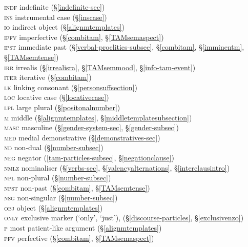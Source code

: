 \begin{tabbing}
	\textsc{indf} \> {indefinite (\S\ref{indefinite-sec})}\\
	\textsc{ins} \> {instrumental case (\S\ref{inscase})}\\
	\textsc{io} \> {indirect object (\S\ref{alignmtemplates})}\\
	\textsc{ipfv} \> {imperfective (\S\ref{combitam}, \S\ref{TAMsemaspect})}\\
	\textsc{ipst} \> {immediate past (\S\ref{verbal-proclitics-subsec}, \S\ref{combitam}, \S\ref{imminentm}, \S\ref{TAMsemtense})}\\
	\textsc{irr} \> {irrealis (\S\ref{irrealisra}, \S\ref{TAMsemmood}, \S\ref{info-tam-event})}\\
	\textsc{iter} \> {iterative  (\S\ref{combitam})}\\
	\textsc{lk} \> {linking consonant (\S\ref{personsuffsection})}\\
	\textsc{loc} \> {locative case (\S\ref{locativecase})}\\
	\textsc{lpl} \> {large plural (\S\ref{positonalnumber})}\\
	\textsc{m} \> {middle (\S\ref{alignmtemplates}, \S\ref{middletemplatesubsection})}\\
	\textsc{masc} \> {masculine (\S\ref{gender-system-sec}, \S\ref{gender-subsec})}\\
	\textsc{med} \> {medial demonstrative (\S\ref{demonstratives-sec})}\\
	\textsc{nd} \> {non-dual (\S\ref{number-subsec})}\\
	\textsc{neg} \> {negator (\ref{tam-particles-subsec}, \S\ref{negationclause})} \\
	\textsc{nmlz} \> {nominaliser (\S\ref{verbs-sec}, \S\ref{valencyalternations}, \S\ref{interclausintro})}\\
	\textsc{npl} \> {non-plural (\S\ref{number-subsec})}\\
	\textsc{npst} \> {non-past (\S\ref{combitam}, \S\ref{TAMsemtense})}\\
	\textsc{nsg} \> {non-singular (\S\ref{number-subsec})}\\
	\textsc{obj} \> {object (\S\ref{alignmtemplates})}\\
	\textsc{only} \> {exclusive marker (`only', `just'), (\S\ref{discourse-particles}, \S\ref{exclusivenzo})}\\
	\textsc{p} \> {most patient-like argument (\S\ref{alignmtemplates})}\\
	\textsc{pfv} \> {perfective (\S\ref{combitam}, \S\ref{TAMsemaspect})}\\

\end{tabbing}
